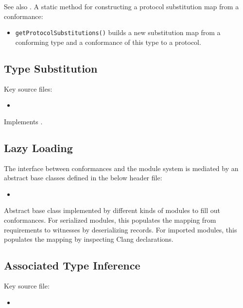\documentclass[../generics]{subfiles}
\begin{document}
See also . A static method for constructing a protocol substitution map from a conformance:
\begin{itemize}
\item \texttt{getProtocolSubstitutions()} builds a new substitution map from a conforming type and a conformance of this type to a protocol.
\end{itemize}

\subsection*{Type Substitution}

Key source files:
\begin{itemize}
\item {}
\end{itemize}

Implements .

\subsection*{Lazy Loading}

The interface between conformances and the module system is mediated by an abstract base classes defined in the below header file:
\begin{itemize}
\item {}
\end{itemize}

Abstract base class implemented by different kinds of modules to fill out conformances. For serialized modules, this populates the mapping from requirements to witnesses by deserializing records. For imported modules, this populates the mapping by inspecting Clang declarations.

\subsection*{Associated Type Inference}

Key source file:
\begin{itemize}
\item {}
\end{itemize}
\end{document}

